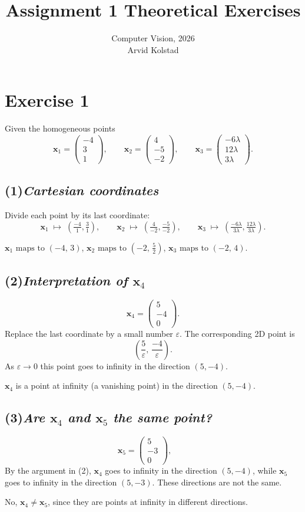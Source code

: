 \documentclass[11pt,a4paper]{article}
\title{Assignment 1  Theoretical Exercises}
\author{Computer Vision, 2026 \\ Arvid Kolstad}
\date{}
\newcommand{\vb}[1]{\mathbf{#1}}
\newcommand{\vect}[1]{
    \begin{pmatrix}#1
\end{pmatrix}}
\newcommand{\exercise}[1]{
\section*{Exercise #1}}
\newcommand{\task}[2]{
\subsection*{#1\quad\normalfont\textit{#2}}}
\begin{document}
\maketitle

\exercise{1}

Given the homogeneous points
\[
    \vb{x}_1 = \vect{-4\\3\\1},\qquad
    \vb{x}_2 = \vect{4\\-5\\-2},\qquad
    \vb{x}_3 = \vect{-6\lambda \\12\lambda \\3\lambda}.
\]

\task{(1)}{Cartesian coordinates}

Divide each point by its last coordinate:
\[
    \vb{x}_1 \;\mapsto\; \left(\tfrac{-4}{1},\tfrac{3}{1}\right),\qquad
    \vb{x}_2 \;\mapsto\; \left(\tfrac{4}{-2},\tfrac{-5}{-2}\right),\qquad
    \vb{x}_3 \;\mapsto\;
    \left(\tfrac{-6\lambda}{3\lambda},\tfrac{12\lambda}{3\lambda}\right).
\]
\begin{answer}
    $\vb{x}_1 \text{ maps to } (-4,\,3)$, \quad $\vb{x}_2 \text{ maps to }
    (-2,\,\tfrac{5}{2})$, \quad $\vb{x}_3  \text{ maps to }(-2,\,4)$.
\end{answer}

\task{(2)}{Interpretation of $\vb{x}_4$}

\[
    \vb{x}_4 = \vect{5\\-4\\0}.
\]
Replace the last coordinate by a small number $\varepsilon$. The
corresponding 2D point is
\[
    \left(\frac{5}{\varepsilon},\,\frac{-4}{\varepsilon}\right).
\]
As $\varepsilon \to 0$ this point goes to infinity in the
direction $(5,-4)$.
\begin{answer}
    $\vb{x}_4$ is a point at infinity (a vanishing point) in the
    direction $(5,-4)$.
\end{answer}

\task{(3)}{Are $\vb{x}_4$ and $\vb{x}_5$ the same point?}
\[
    \vb{x}_5 = \vect{5\\-3\\0},\qquad
\]
By the argument in (2), $\vb{x}_4$ goes to infinity in the
direction $(5,-4)$,
while $\vb{x}_5$ goes to infinity in the direction $(5,-3)$. These
directions are not the same.
\begin{answer}
    No, $\vb{x}_4 \neq \vb{x}_5$, since they are points at infinity
    in different directions.
\end{answer}
\end{document}
